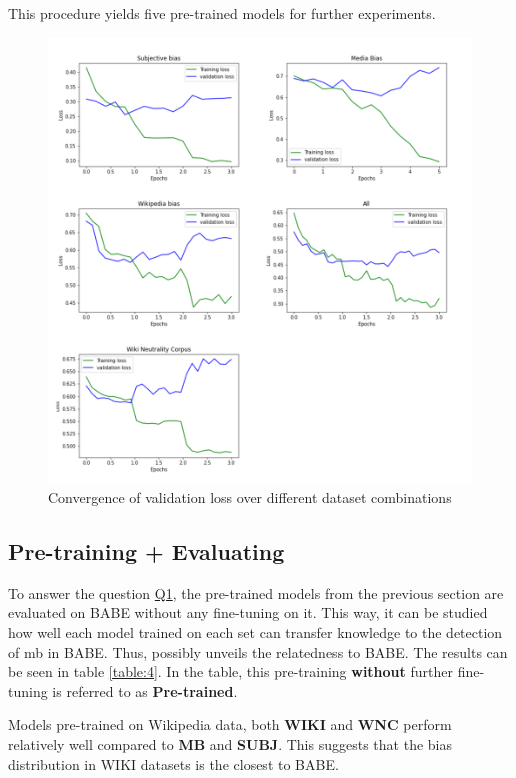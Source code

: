 This procedure yields five pre-trained models for further experiments.

\begin{figure}
  \includegraphics[scale=0.5]{my_modules/multimedia/all_losses.png}
  \caption{Convergence of validation loss over different dataset combinations}
  \label{fig:all_losses}
\end{figure}



\subsection{Pre-training + Evaluating}
To answer the question \hyperref[Q1]{Q1}, the pre-trained models from the previous section are evaluated on BABE without any fine-tuning on it. This way, it can be studied how well each model trained on each set can transfer knowledge to the detection of \gls{mb} in BABE. Thus, possibly unveils the relatedness to BABE. The results can be seen in table \ref{table:4}. In the table, this pre-training \textbf{without} further fine-tuning is referred to as \textbf{Pre-trained}.

Models pre-trained on Wikipedia data, both \textbf{WIKI} and \textbf{WNC} perform relatively well compared to \textbf{MB} and \textbf{SUBJ}. This suggests that the bias distribution in WIKI datasets is the closest to BABE.

